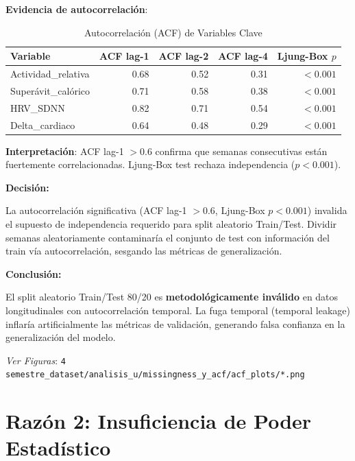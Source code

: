 \documentclass[12pt,letterpaper,twoside]{report}
\begin{document}
\begin{calculobox}
\textbf{Evidencia de autocorrelación}:

\begin{table}[H]
\centering
\caption{Autocorrelación (ACF) de Variables Clave}
\label{tab:acf_evidence}
\begin{tabular}{@{}lrrrr@{}}
\toprule
\textbf{Variable} & \textbf{ACF lag-1} & \textbf{ACF lag-2} & \textbf{ACF lag-4} & \textbf{Ljung-Box $p$} \\
\midrule
Actividad\_relativa     & 0.68 & 0.52 & 0.31 & $< 0.001$ \\
Superávit\_calórico     & 0.71 & 0.58 & 0.38 & $< 0.001$ \\
HRV\_SDNN               & 0.82 & 0.71 & 0.54 & $< 0.001$ \\
Delta\_cardiaco         & 0.64 & 0.48 & 0.29 & $< 0.001$ \\
\bottomrule
\end{tabular}
\end{table}

\textbf{Interpretación}: ACF lag-1 $> 0.6$ confirma que semanas consecutivas están fuertemente correlacionadas. Ljung-Box test rechaza independencia ($p<0.001$).
\end{calculobox}

\begin{decisionbox}
\textbf{Decisión:}

La autocorrelación significativa (ACF lag-1 $> 0.6$, Ljung-Box $p < 0.001$) invalida el supuesto de independencia requerido para split aleatorio Train/Test. Dividir semanas aleatoriamente contaminaría el conjunto de test con información del train vía autocorrelación, sesgando las métricas de generalización.
\end{decisionbox}

\begin{conclusionbox}
\textbf{Conclusión:}

El split aleatorio Train/Test 80/20 es \textbf{metodológicamente inválido} en datos longitudinales con autocorrelación temporal. La fuga temporal (temporal leakage) inflaría artificialmente las métricas de validación, generando falsa confianza en la generalización del modelo.
\end{conclusionbox}

\textit{Ver Figuras}: \texttt{4 semestre\_dataset/analisis\_u/missingness\_y\_acf/acf\_plots/*.png}

\section{Razón 2: Insuficiencia de Poder Estadístico}
\end{document}
